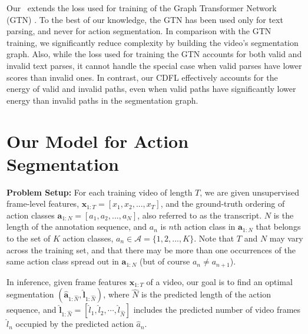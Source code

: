 \documentclass[10pt,twocolumn,letterpaper]{article}
\begin{document}
Our \abbrmodel\ extends the loss used for training of the Graph Transformer Network (GTN) \cite{lecun1998gradient, le1997reading, bottou2005graph, collobert2011deep}. To the best of our knowledge, the GTN has been used only for text parsing, and never for action segmentation. In comparison with the GTN training, we significantly reduce complexity by building the video's segmentation graph. Also, while the loss used for training the GTN accounts for both valid and invalid text parses, it cannot handle the special case when valid parses have lower scores than invalid ones. In contrast, our CDFL effectively accounts for the energy of valid and invalid paths, even when valid paths have significantly lower energy than invalid paths in the segmentation graph. 



\section{Our Model for Action Segmentation}\label{sec:HMM}
\noindent
{\bf Problem Setup:} For each training video of length $T$, we are given unsupervised frame-level features, $\bm{x}_{1:T} = [x_1,x_2,...,x_T]$, and the ground-truth ordering of action classes $\bm{a}_{1:N} = [a_1, a_2, ..., a_N]$, also referred to as the transcript.  $N$ is the length of the annotation sequence, and $a_n$ is $n$th action class in $\bm{a}_{1:N}$  that belongs to the set of $K$ action classes, $a_n\in\mathcal{A}=\{1,2,...,K\}$. Note that $T$ and $N$ may vary across the training set, and that there may be more than one occurrences of the same action class spread out in $\bm{a}_{1:N}$ (but of course $a_n\ne a_{n+1}$).



In inference, given frame features $\bm{x}_{1:T}$ of a video,  our goal is to find an optimal segmentation $(\hat{\bm{a}}_{1:\hat{N}}, \hat{\bm{l}}_{1:\hat{N}})$,  where $\hat{N}$ is the predicted length of the action sequence, and  $\hat{\bm{l}}_{1:\hat{N}} = [\hat{l}_1,\hat{l}_2,\cdots, \hat{l}_{\hat{N}}]$ includes the predicted number of video frames $\hat{l}_n$ occupied by the predicted action $\hat{a}_n$.
\end{document}

